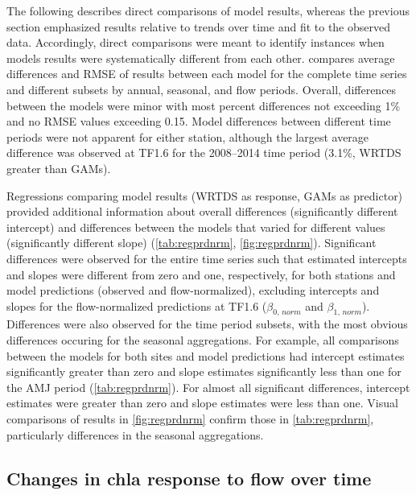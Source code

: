 \documentclass{svjour3}\usepackage[]{graphicx}\usepackage[]{color}
\begin{document}
The following describes direct comparisons of model results, whereas the previous section emphasized results relative to trends over time and fit to the observed data.  Accordingly, direct comparisons were meant to identify instances when models results were systematically different from each other.   compares average differences and \ac{RMSE} of results between each model for the complete time series and different subsets by annual, seasonal, and flow periods.  Overall, differences between the models were minor with most percent differences not exceeding 1\% and no \ac{RMSE} values exceeding 0.15.  Model differences between different time periods were not apparent for either station, although the largest average difference was observed at TF1.6 for the 2008--2014 time period (3.1\%, \ac{WRTDS} greater than \acp{GAM}).

Regressions comparing model results (\ac{WRTDS} as response, \acp{GAM} as predictor) provided additional information about overall differences (significantly different intercept) and differences between the models that varied for different values (significantly different slope) (\cref{tab:regprdnrm}, \cref{fig:regprdnrm}).  Significant differences were observed for the entire time series such that estimated intercepts and slopes were different from zero and one, respectively, for both stations and model predictions (observed and flow-normalized), excluding intercepts and slopes for the flow-normalized predictions at TF1.6 ($\beta_{0,\,norm}$ and $\beta_{1,\,norm}$).  Differences were also observed for the time period subsets, with the most obvious differences occuring for the seasonal aggregations.  For example, all comparisons between the models for both sites and model predictions had intercept estimates significantly greater than zero and slope estimates significantly less than one for the \ac{AMJ} period (\cref{tab:regprdnrm}). For almost all significant differences, intercept estimates were greater than zero and slope estimates were less than one.  Visual comparisons of results in \cref{fig:regprdnrm} confirm those in \cref{tab:regprdnrm}, particularly differences in the seasonal aggregations.

\subsection{Changes in \ac{chla} response to flow over time}
\end{document}
